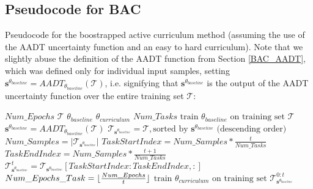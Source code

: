 \subsection{Pseudocode for BAC}\label{BACPseudocode}
Pseudocode for the boostrapped active curriculum method (assuming the use of the AADT uncertainty function and an easy to hard curriculum). Note that we slightly abuse the definition of the AADT function from Section \ref{BAC_AADT}, which was defined only for individual input samples, setting $\mathbf{s}^{\theta_{baseline}} = AADT_{\theta_{baseline}}(\mathcal{T}) $, i.e. signifying that $\mathbf{s}^{\theta_{baseline}} $ is the output of the AADT uncertainty function over the entire training set $\mathcal{T}$:
\begin{algorithmic} 
\REQUIRE $Num\_Epochs$ 	
\REQUIRE $\mathcal{T}$ 	
\REQUIRE $\theta_{baseline}$ 	
\REQUIRE $\theta_{curriculum}$ 
\REQUIRE $Num\_Tasks$
\STATE $\text{train }  \theta_{baseline} \text{ on training set } \mathcal{T}$
\ENDFOR
\STATE $\mathbf{s}^{\theta_{baseline}} = AADT_{\theta_{baseline}}(\mathcal{T})$
\STATE $\mathcal{T}_{\mathbf{s}^{\theta_{baseline}}} = \mathcal{T}, \text{sorted by } \mathbf{s}^{\theta_{baseline}} \text{ (descending order)}$ 
\STATE $Num\_Samples = |\mathcal{T}_{\mathbf{s}^{\theta_{baseline}}}|$
\STATE $TaskStartIndex = Num\_Samples*\frac{t}{Num\_Tasks} $
\STATE $TaskEndIndex = Num\_Samples*\frac{t+1}{Num\_Tasks} $
\STATE $\mathcal{T}^{t}_{\mathbf{s}^{\theta_{baseline}}} = \mathcal{T}_{\mathbf{s}^{\theta_{baseline}}}[TaskStartIndex:TaskEndIndex,:] $
\ENDFOR
{}
\STATE $Num\_Epochs\_Task = \lfloor\frac{Num\_Epochs}{t}\rfloor$
\STATE $\text{train }  \theta_{curriculum} \text{ on training set } \mathcal{T}^{0:t}_{\mathbf{s}^{\theta_{baseline}}} $
\ENDFOR
\ENDFOR
\end{algorithmic}

